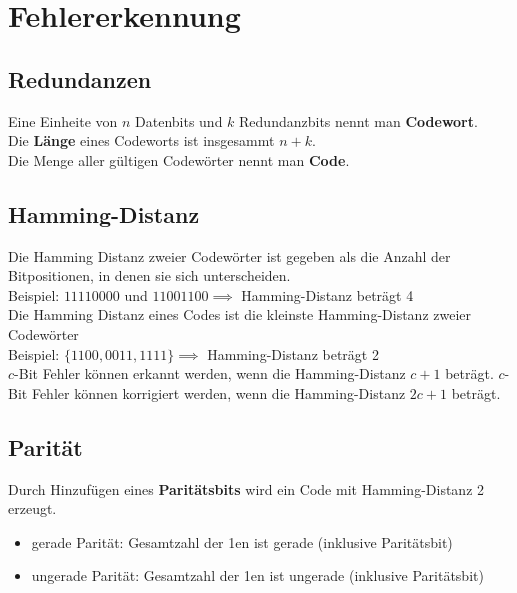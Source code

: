 \documentclass[12pt]{article}
\begin{document}
\section{Fehlererkennung}
\subsection{Redundanzen}
Eine Einheite von $n$ Datenbits und $k$ Redundanzbits nennt man \textbf{Codewort}.\\
Die \textbf{Länge} eines Codeworts ist insgesammt $n+k$.\\
Die Menge aller gültigen Codewörter nennt man \textbf{Code}.
\subsection{Hamming-Distanz}
Die Hamming Distanz zweier Codewörter ist gegeben als die Anzahl der Bitpositionen, in denen sie sich unterscheiden. \\
\indent Beispiel: $11110000$ und $11001100 \implies$ Hamming-Distanz beträgt 4 \\ \newline 
Die Hamming Distanz eines Codes ist die kleinste Hamming-Distanz zweier Codewörter \\
\indent Beispiel: $\{1100, 0011, 1111\} \implies$ Hamming-Distanz beträgt 2 \\ \newline
$c$-Bit Fehler können erkannt werden, wenn die Hamming-Distanz $c+1$ beträgt.
$c$-Bit Fehler können korrigiert werden, wenn die Hamming-Distanz $2c+1$ beträgt.
\subsection{Parität}
Durch Hinzufügen eines \textbf{Paritätsbits} wird ein Code mit Hamming-Distanz 2 erzeugt.
\begin{itemize}
    \item[] gerade Parität: Gesamtzahl der 1en ist gerade (inklusive Paritätsbit)
    \item[] ungerade Parität: Gesamtzahl der 1en ist ungerade (inklusive Paritätsbit)
\end{itemize}
\end{document}

